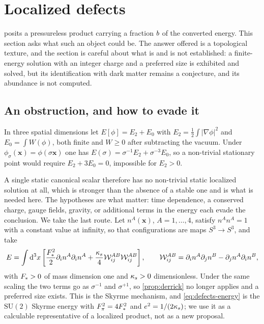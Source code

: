 \section{Localized defects}\label{sec:defects}

 posits a pressureless product carrying a fraction $b$
of the converted energy. This section asks what such an object could be. The
answer offered is a topological texture, and the section is careful about what
is and is not established: a finite-energy solution with an integer charge and
a preferred size is exhibited and solved, but its identification with dark
matter remains a conjecture, and its abundance is not computed.

\subsection{An obstruction, and how to evade it}\label{sec:defects-derrick}

\begin{proposition}\label{prop:derrick}
  In three spatial dimensions let $E[\phi]=E_2+E_0$ with
  $E_2=\tfrac12\int|\nabla\phi|^2$ and $E_0=\int W(\phi)$, both finite and
  $W\ge0$ after subtracting the vacuum. Under $\phi_\sigma(\mathbf
  x)=\phi(\sigma\mathbf x)$ one has $E(\sigma)=\sigma^{-1}E_2+\sigma^{-3}E_0$,
  so a non-trivial stationary point would require $E_2+3E_0=0$, impossible for
  $E_2>0$.
\end{proposition}

A single static canonical scalar therefore has no non-trivial static localized
solution at all, which is stronger than the absence of a stable one and is what
is needed here.
The hypotheses are what matter: time dependence, a conserved charge, gauge
fields, gravity, or additional terms in the energy each evade the conclusion.
We take the last route. Let $n^A(\mathbf x)$, $A=1,\dots,4$, satisfy
$n^An^A=1$ with a constant value at infinity, so that configurations are maps
$S^3\to S^3$, and take
%
\begin{equation}\label{eq:defects-energy}
  E=\int \mathrm{d}^3x\left[\frac{F_{*}^2}{2}\partial_i n^A\partial_i n^A
  +\frac{\kappa_{s}}{4}\mathcal W_{ij}^{AB}\mathcal W_{ij}^{AB}\right],
  \qquad
  \mathcal W_{ij}^{AB}=\partial_i n^A\partial_j n^B-\partial_j n^A\partial_i n^B ,
\end{equation}
%
with $F_{*}>0$ of mass dimension one and $\kappa_{s}>0$ dimensionless. Under the
same scaling the two terms go as $\sigma^{-1}$ and $\sigma^{+1}$, so
\cref{prop:derrick} no longer applies and a preferred size exists. This is the
Skyrme mechanism, and \cref{eq:defects-energy} is the $\mathrm{SU}(2)$ Skyrme
energy with $F_\pi^2=4F_{*}^2$ and $e^2=1/(2\kappa_{s})$; we use it as a
calculable representative of a localized product, not as a new proposal.

